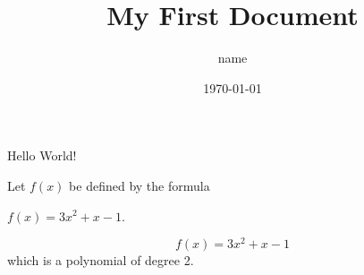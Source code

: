 \documentclass{article} %
\title{My First Document} %
\author{name} %
\date{\today} %
\begin{document}
    \maketitle

    Hello World!

    Let $f(x)$ be defined by the formula  %

    $f(x) = 3x^2 + x - 1$. %

    $$f(x) = 3x^2 + x - 1$$ which is a polynomial of degree 2. %
\end{document}
